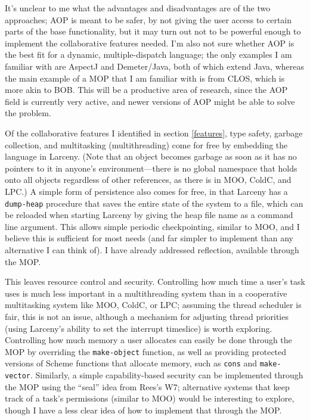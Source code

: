 \documentclass{article}
\begin{document}
It's unclear to me what the advantages and disadvantages are of the
two approaches; AOP is meant to be safer, by not giving the user
access to certain parts of the base functionality, but it may turn out
not to be powerful enough to implement the collaborative features
needed.  I'm also not sure whether AOP is the best fit for a dynamic,
multiple-dispatch language; the only examples I am familiar with are
AspectJ\cite{AspectJ} and
Demeter/Java\cite{DemeterJava}\cite{DemeterJavaRD}, both of which
extend Java, whereas the main example of a MOP that I am familiar with
is from CLOS\cite{AMOP}, which is more akin to BOB.  This will be a
productive area of research, since the AOP field is currently very
active, and newer versions of AOP might be able to solve the problem.

Of the collaborative features I identified in section
\ref{features}, type safety, garbage collection, and multitasking
(multithreading) come for free by embedding the language in Larceny.
(Note that an object becomes garbage as soon as it has no pointers to
it in anyone's environment---there is no global namespace that holds
onto all objects regardless of other references, as there is in MOO,
ColdC, and LPC.)  A simple form of persistence also comes for free, in
that Larceny has a \texttt{dump-heap} procedure that saves the entire
state of the system to a file, which can be reloaded when starting
Larceny by giving the heap file name as a command line argument.  This
allows simple periodic checkpointing, similar to MOO, and I believe
this is sufficient for most needs (and far simpler to implement than
any alternative I can think of).  I have already addressed reflection,
available through the MOP.

This leaves resource control and security.  Controlling how much time
a user's task uses is much less important in a multithreading system
than in a cooperative multitasking system like MOO, ColdC, or LPC;
assuming the thread scheduler is fair, this is not an issue, although
a mechanism for adjusting thread priorities (using Larceny's ability
to set the interrupt timeslice) is worth exploring.  Controlling how
much memory a user allocates can easily be done through the MOP by
overriding the \texttt{make-object} function, as well as providing
protected versions of Scheme functions that allocate memory, such as
\texttt{cons} and \texttt{make-vector}.  Similarly, a simple
capability-based security can be implemented through the MOP using the
``seal'' idea from Rees's W7\cite{W7}; alternative systems that keep
track of a task's permissions (similar to MOO) would be interesting to
explore, though I have a less clear idea of how to implement that
through the MOP.
\end{document}
